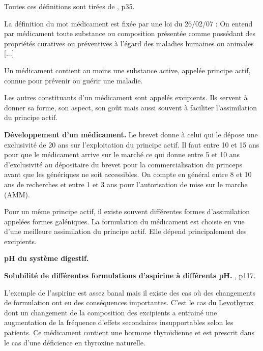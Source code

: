 Toutes ces définitions sont tirées de \cite{Prevost2017}, p35.

La définition du mot médicament est fixée par une loi du 26/02/07 : \og On entend par médicament toute substance ou composition présentée comme possédant des propriétés curatives ou préventives à l'égard des maladies humaines ou animales [...] \fg{}

Un médicament contient au moins une substance active, appelée principe actif, connue pour prévenir ou guérir une maladie.

Les autres constituants d'un médicament sont appelés excipients.
Ils servent à donner sa forme, son aspect, son goût mais aussi souvent à faciliter l'assimilation du principe actif.

\begin{slide}
\textbf{Développement d'un médicament.}
Le brevet donne à celui qui le dépose une exclusivité de 20 ans sur l'exploitation du principe actif.
Il faut entre 10 et 15 ans pour que le médicament arrive sur le marché ce qui donne entre 5 et 10 ans d'exclusivité au dépositaire du brevet pour la commercialisation du princeps avant que les génériques ne soit accessibles.
On compte en général entre 8 et 10 ans de recherches et entre 1 et 3 ans pour l'autorisation de mise sur le marche (AMM).
\end{slide}

Pour un même principe actif, il existe souvent différentes formes d'assimilation appelées formes galéniques.
La formulation du médicament est choisie en vue d'une meilleure assimilation du principe actif.
Elle dépend principalement des excipients.

\begin{slide}
\textbf{pH du système digestif.}
\end{slide}

\begin{experience}
\textbf{Solubilité de différentes formulations d'aspirine à différents pH.}
\cite{Bataille2010}, p117.
\end{experience}

L'exemple de l'aspirine est assez banal mais il existe des cas où des changements de formulation ont eu des conséquences importantes.
C'est le cas du \href{https://www.pourquoidocteur.fr/Articles/Question-d-actu/24371-Levothyrox-nombre-inattendu-d-effets-secondaires-deja-connus-Elements-d-explication}{Levothyrox} dont un changement de la composition des excipients a entrainé une augmentation de la fréquence d'effets secondaires insupportables selon les patients.
Ce médicament contient une hormone thyroïdienne et est prescrit dans le cas d'une déficience en thyroxine naturelle.

